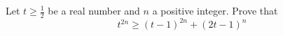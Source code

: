 Let $t\ge\frac{1}{2}$ be a real number and $n$ a positive integer. Prove that\[t^{2n}\ge (t-1)^{2n}+(2t-1)^n\]